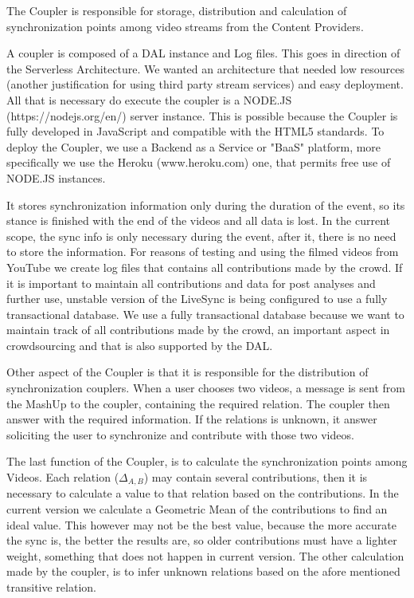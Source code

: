The Coupler is responsible for storage, distribution and calculation of synchronization points among video streams from the Content Providers.

A coupler is composed of a DAL instance and Log files. This goes in direction of the Serverless Architecture. We wanted an architecture that needed low resources (another justification for using third party stream services) and easy deployment. All that is necessary do execute the coupler is a NODE.JS (https://nodejs.org/en/) server instance. This is possible because the Coupler is fully developed in JavaScript and compatible with the HTML5 standards. To deploy the Coupler, we use a Backend as a Service or "BaaS" platform, more specifically we use the Heroku (www.heroku.com) one, that permits free use of NODE.JS instances.

It stores synchronization information only during the duration of the event, so its stance is finished with the end of the videos and all data is lost. In the current scope, the sync info is only necessary during the event, after it, there is no need to store the information. For reasons of testing and using the filmed videos from YouTube we create log files that contains all contributions made by the crowd. If it is important to maintain all contributions and data for post analyses and further use, unstable version of the LiveSync is being configured to use a fully transactional database. We use a fully transactional database because we want to maintain track of all contributions made by the crowd, an important aspect in crowdsourcing and that is also supported by the DAL.

Other aspect of the Coupler is that it is responsible for the distribution of synchronization couplers. When a user chooses two videos, a message is sent from the MashUp to the coupler, containing the required relation. The coupler then answer with the required information. If the relations is unknown, it answer soliciting the user to synchronize and contribute with those two videos.

The last function of the Coupler, is to calculate the synchronization points among Videos. Each relation ($\Delta_{A,B}$) may contain several contributions, then it is necessary to calculate a value to that relation based on the contributions. In the current version we calculate a Geometric Mean of the contributions to find an ideal value. This however may not be the best value, because the more accurate the sync is, the better the results are, so older contributions must have a lighter weight, something that does not happen in current version. The other calculation made by the coupler, is to infer unknown relations based on the afore mentioned transitive relation.

